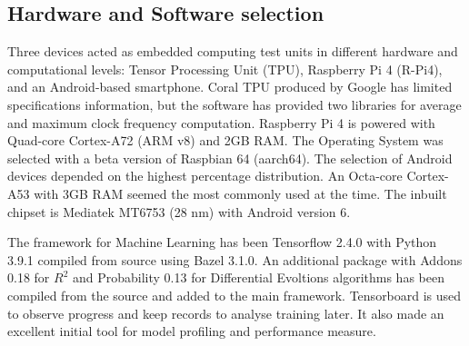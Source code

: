 \subsection{Hardware and Software selection} \label{subsec:soft}

%
Three devices acted as embedded computing test units in different hardware and computational levels: Tensor Processing Unit (TPU), Raspberry Pi 4 (R-Pi4), and an Android-based smartphone.
Coral TPU produced by Google has limited specifications information, but the software has provided two libraries for average and maximum clock frequency computation.
Raspberry Pi 4 is powered with Quad-core Cortex-A72 (ARM v8) and 2GB RAM.
The Operating System was selected with a beta version of Raspbian 64 (aarch64).
The selection of Android devices depended on the highest percentage distribution.
An Octa-core Cortex-A53 with 3GB RAM seemed the most commonly used at the time.
The inbuilt chipset is Mediatek MT6753 (28 nm) with Android version 6.

%
The framework for Machine Learning has been Tensorflow 2.4.0 with Python 3.9.1 compiled from source using Bazel 3.1.0.
An additional package with Addons 0.18 for $R^2$ and Probability 0.13 for Differential Evoltions algorithms has been compiled from the source and added to the main framework.
Tensorboard is used to observe progress and keep records to analyse training later. It also made an excellent initial tool for model profiling and performance measure.

